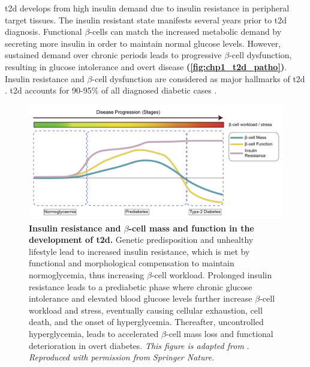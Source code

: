 \acrfull{t2d} develops from high insulin demand due to insulin resistance in peripheral target tissues. The insulin resistant state manifests several years prior to \gls{t2d} diagnosis. Functional $\beta$-cells can match the increased metabolic demand by secreting more insulin in order to maintain normal glucose levels. However, sustained demand over chronic periods leads to progressive $\beta$-cell dysfunction, resulting in glucose intolerance and overt disease \textbf{(\autoref{fig:chp1_t2d_patho})}. Insulin resistance and $\beta$-cell dysfunction are considered as major hallmarks of \gls{t2d} \textbf{\cite{banday_pathophysiology_2020}}. \gls{t2d} accounts for 90-95\% of all diagnosed diabetic cases \textbf{\cite{home_idf_nodate,banday_pathophysiology_2020,elsayed_2_2022}}.

\begin{figure}[H]
    \centering
    \includegraphics[width=\linewidth]{Chapter1/Fig/F1-3-04.png}
    \caption[Pathogenesis of ]{\textbf{Insulin resistance and $\beta$-cell mass and function in the development of \gls{t2d}.} Genetic predisposition and unhealthy lifestyle lead to increased insulin resistance, which is met by functional and morphological compensation to maintain normoglycemia, thus increasing $\beta$-cell workload. Prolonged insulin resistance leads to a prediabetic phase where chronic glucose intolerance and elevated blood glucose levels further increase $\beta$-cell workload and stress, eventually causing cellular exhaustion, cell death, and the onset of hyperglycemia. Thereafter, uncontrolled hyperglycemia, leads to accelerated $\beta$-cell mass loss and functional deterioration in overt diabetes. \textit{This figure is adapted from }\textbf{\cite{chen_human_2017}}.\textit{ Reproduced with permission from Springer Nature.}}
    \label{fig:chp1_t2d_patho}
\end{figure}

